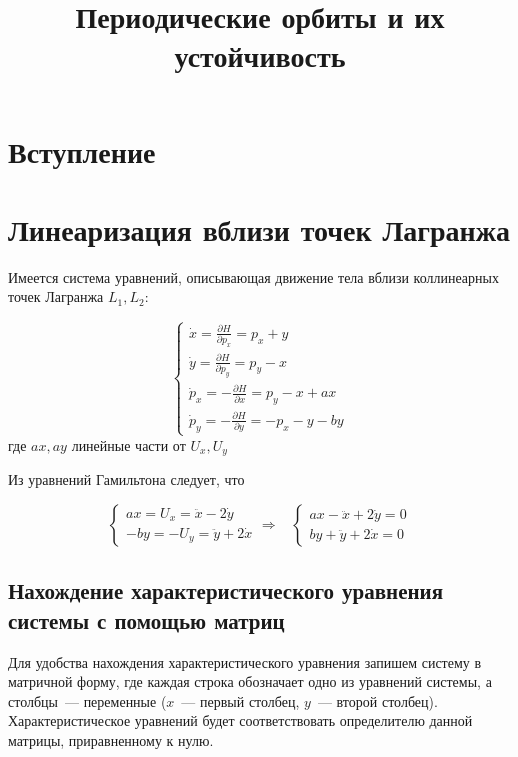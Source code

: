 \documentclass[12pt, a4paper]{article}
\title{Периодические орбиты и их устойчивость}
\date{}
\author{}
\begin{document}
\maketitle
\tableofcontents
\newpage
\section{Вступление}

\section{Линеаризация вблизи точек Лагранжа}

Имеется система уравнений, описывающая движение тела вблизи коллинеарных точек Лагранжа  $L_1, L_2$:

\begin{equation}
\label{linear}
    \begin{cases}
        \dot x = \frac{\partial H}{\partial p_x} = p_x + y\\
        \dot y = \frac{\partial H}{\partial p_y} = p_y - x\\
        \dot p_x = - \frac{\partial H}{\partial x} = p_y - x + ax\\
        \dot p_y = - \frac{\partial H}{\partial y} = - p_x - y - by
    \end{cases}
\end{equation}
где $ax, ay$ линейные части от $U_x, U_y$

Из уравнений Гамильтона следует, что 

\begin{equation}
\label{u_xy}
    \begin{cases}
        ax = U_x = \ddot x - 2 \dot y\\
        - by = - U_y = \ddot y + 2 \dot x 
    \end{cases}
    \Rightarrow
    \;\;\;
    \begin{cases}
         ax - \ddot x + 2 \dot y = 0\\
         by + \ddot y + 2 \dot x = 0
    \end{cases}
\end{equation}

\subsection{Нахождение характеристического уравнения системы с помощью матриц}

Для удобства нахождения характеристического уравнения запишем систему в матричной форму, где каждая строка обозначает одно из уравнений системы, а столбцы~--- переменные ($x$~---  первый столбец, $y$~--- второй столбец). Характеристическое уравнений будет соответствовать определителю данной матрицы, приравненному к нулю.\\ 
\end{document}
